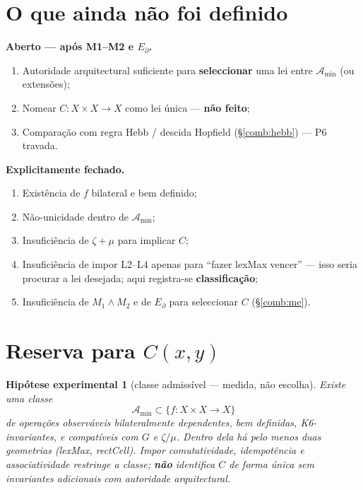 \documentclass[11pt,a4paper]{article}
\newtheorem{hipotese}[teorema]{Hipótese experimental}
\begin{document}
\section{O que ainda não foi definido}\label{comb:aberto}

\noindent\textbf{Aberto --- após M1--M2 e $E_{\partial}$.}
\begin{enumerate}\itemsep3pt
\item Autoridade arquitectural suficiente para \textbf{seleccionar} uma lei entre
$\mathcal A_{\min}$ (ou extensões);
\item Nomear $C\colon X\times X\to X$ como lei única --- \textbf{não feito};
\item Comparação com regra Hebb / descida Hopfield (§\ref{comb:hebb}) --- P6 travada.
\end{enumerate}

\medskip\noindent\textbf{Explicitamente fechado.}
\begin{enumerate}\itemsep3pt
\item Existência de $f$ bilateral e bem definido;
\item Não-unicidade dentro de $\mathcal A_{\min}$;
\item Insuficiência de $\zeta+\mu$ para implicar $C$;
\item Insuficiência de impor L2--L4 apenas para ``fazer lexMax vencer'' --- isso seria
procurar a lei desejada; aqui registra-se \textbf{classificação};
\item Insuficiência de $M_1\wedge M_2$ e de $E_{\partial}$ para seleccionar $C$
(§\ref{comb:me}).
\end{enumerate}

\section{Reserva para $C(x,y)$}\label{comb:reserva}

\begin{hipotese}[classe admissível --- medida, não escolha]\label{comb:hip-exist}
Existe uma classe
\[
\mathcal A_{\min}\subset\{f\colon X\times X\to X\}
\]
de operações observáveis bilateralmente dependentes, bem definidas, K6-invariantes,
e compatíveis com $G$ e $\zeta/\mu$. Dentro dela há pelo menos duas geometrias (lexMax, rectCell).
Impor comutatividade, idempotência e associatividade restringe a classe; \textbf{não}
identifica $C$ de forma única sem invariantes adicionais com autoridade arquitectural.
\end{hipotese}
\end{document}

